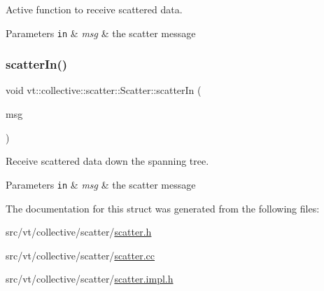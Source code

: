 Active function to receive scattered data. 


\begin{DoxyParams}[1]{Parameters}
\mbox{\tt in}  & {\em msg} & the scatter message \\
\hline
\end{DoxyParams}
\mbox{\label{structvt_1_1collective_1_1scatter_1_1_scatter_aa80a957377cce3126058f3d7d30d2fed}} 
\subsubsection{\texorpdfstring{scatter\+In()}{scatterIn()}}
{\footnotesize\ttfamily void vt\+::collective\+::scatter\+::\+Scatter\+::scatter\+In (\begin{DoxyParamCaption}\item[{\hyperlink{structvt_1_1collective_1_1scatter_1_1_scatter_msg}{Scatter\+Msg} $\ast$}]{msg }\end{DoxyParamCaption})\hspace{0.3cm}{\ttfamily [protected]}}



Receive scattered data down the spanning tree. 


\begin{DoxyParams}[1]{Parameters}
\mbox{\tt in}  & {\em msg} & the scatter message \\
\hline
\end{DoxyParams}


The documentation for this struct was generated from the following files\+:\begin{DoxyCompactItemize}
\item 
src/vt/collective/scatter/\hyperlink{scatter_8h}{scatter.\+h}\item 
src/vt/collective/scatter/\hyperlink{scatter_8cc}{scatter.\+cc}\item 
src/vt/collective/scatter/\hyperlink{scatter_8impl_8h}{scatter.\+impl.\+h}\end{DoxyCompactItemize}
